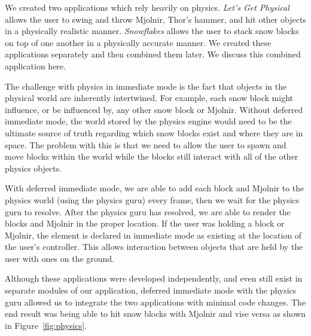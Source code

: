 \documentclass[conference,12pt]{IEEEtran}
\begin{document}
We created two applications which rely heavily on physics. \textit{Let's Get
Physical} allows the user to swing and throw Mjolnir, Thor's hammer, and hit
other objects in a physically realistic manner. \textit{Snowflakes} allows the
user to stack snow blocks on top of one another in a physically accurate manner.
We created these applications separately and then combined them later. We
discuss this combined application here.

The challenge with physics in immediate mode is the fact that objects in the
physical world are inherently intertwined. For example, each snow block might
influence, or be influenced by, any other snow block or Mjolnir. Without
deferred immediate mode, the world stored by the physics engine would need to be
the ultimate source of truth regarding which snow blocks exist and where they
are in space. The problem with this is that we need to allow the user to spawn
and move blocks within the world while the blocks still interact with all of the
other physics objects.

With deferred immediate mode, we are able to add each block and Mjolnir to the
physics world (using the physics guru) every frame, then we wait for the physics
guru to resolve. After the physics guru has resolved, we are able to render
the blocks and Mjolnir in the proper location. If the user was holding a block
or Mjolnir, the element is declared in immediate mode as existing at the
location of the user's controller. This allows interaction between objects that
are held by the user with ones on the ground.

Although these applications were developed independently, and even still exist
in separate modules of our application, deferred immediate mode with the physics
guru allowed us to integrate the two applications with minimal code changes. The
end result was being able to hit snow blocks with Mjolnir and vise versa as
shown in Figure~\ref{fig:physics}.
\end{document}
